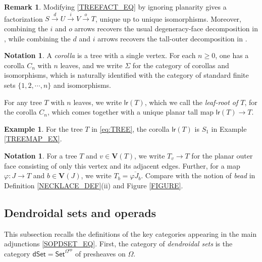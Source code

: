 \documentclass[a4paper,10pt
,draft
]{article}%
\numberwithin{equation}{section}
\numberwithin{figure}{section}
\theoremstyle{definition} %
\newtheorem{example}[equation]{Example}%
\newtheorem{remark}[equation]{Remark}%
\newtheorem{notation}[equation]{Notation}%
\newcommand{\Set}{\ensuremath{\mathsf{Set}}}
\newcommand{\dSet}{\mathsf{dSet}}
\newcommand{\1}{\ensuremath{\mathbbm 1}}%
\begin{document}
\begin{remark}
	Modifying \eqref{TREEFACT_EQ} by ignoring planarity
	gives a factorization 
	$S \xrightarrow{d} U \xrightarrow{i} V
	\xrightarrow{o} T$,
	unique up to unique isomorphisms.
	Moreover, combining the $i$ and $o$ arrows
	recovers the usual degeneracy-face decomposition
	in \cite[Lemma 3.1]{MW07},
	while combining the $d$ and $i$ arrows recovers the 
	tall-outer decomposition in \cite[Prop. 3.36]{BP_geo}.
\end{remark}


\begin{notation}\label{LEAFROOT NOT}
	A \textit{corolla} is a tree with a single vertex.
	For each $n\geq 0$, one has a corolla $C_n$ with $n$ leaves,
	and we write $\Sigma$ for the category of corollas and isomorphisms, which is naturally identified with the category of standard finite sets
	$\{1,2,\cdots,n\}$ and isomorphisms.
	
	For any tree $T$ with $n$ leaves, 
	we write $\mathsf{lr}(T)$,
	which we call the \emph{leaf-root of $T$},
	for the corolla $C_n$,
	which comes together with a unique planar tall map
	$\mathsf{lr}(T) \to T$.
\end{notation}

\begin{example}
	For the tree $T$ in \eqref{eq:TREE},
	the corolla $\mathsf{lr}(T)$ is $S_1$
	in Example \ref{TREEMAP_EX}.
\end{example}



\begin{notation}\label{TV_NOT}
	For a tree $T$ and $v \in \boldsymbol{V}(T)$,
	we write $T_v \to T$ for the planar outer face consisting of only this vertex and its adjacent edges.
	Further, for a map 
	$\varphi \colon J\to T$ and $b \in \boldsymbol{V}(J)$,
	we write
	$T_b = \overline{\varphi J_b}$.
	Compare with the notion of \emph{bead}
	in Definition \ref{NECKLACE_DEF}(ii)
	and Figure \ref{FIGURE}.
\end{notation}



\subsection{Dendroidal sets and operads}
\label{DSETSOPS SEC}


This subsection recalls the definitions
of the key categories appearing in the main adjunctions \eqref{SOPDSET_EQ}.
First, the category of 
\emph{dendroidal sets}
is the category $\dSet = \Set^{\Omega^{op}}$
of presheaves on $\Omega$.
\end{document}
